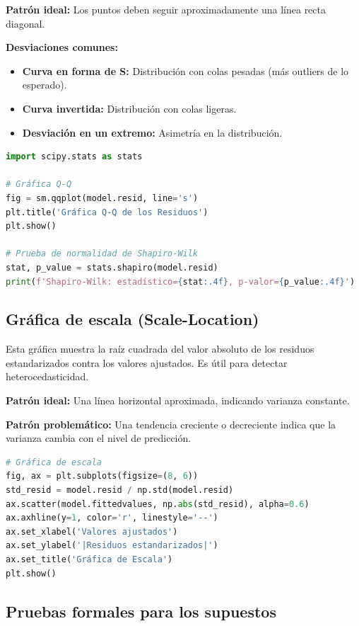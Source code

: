 \textbf{Patrón ideal:} Los puntos deben seguir aproximadamente una línea recta diagonal.

\textbf{Desviaciones comunes:}
\begin{itemize}
	\item \textbf{Curva en forma de S:} Distribución con colas pesadas (más outliers de lo esperado).
	\item \textbf{Curva invertida:} Distribución con colas ligeras.
	\item \textbf{Desviación en un extremo:} Asimetría en la distribución.
\end{itemize}

\begin{lstlisting}[language=Python]
import scipy.stats as stats

# Gráfica Q-Q
fig = sm.qqplot(model.resid, line='s')
plt.title('Gráfica Q-Q de los Residuos')
plt.show()

# Prueba de normalidad de Shapiro-Wilk
stat, p_value = stats.shapiro(model.resid)
print(f'Shapiro-Wilk: estadístico={stat:.4f}, p-valor={p_value:.4f}')
\end{lstlisting}

\subsection{Gráfica de escala (Scale-Location)}

Esta gráfica muestra la raíz cuadrada del valor absoluto de los residuos estandarizados contra los valores ajustados. Es útil para detectar heterocedasticidad.

\textbf{Patrón ideal:} Una línea horizontal aproximada, indicando varianza constante.

\textbf{Patrón problemático:} Una tendencia creciente o decreciente indica que la varianza cambia con el nivel de predicción.

\begin{lstlisting}[language=Python]
# Gráfica de escala
fig, ax = plt.subplots(figsize=(8, 6))
std_resid = model.resid / np.std(model.resid)
ax.scatter(model.fittedvalues, np.abs(std_resid), alpha=0.6)
ax.axhline(y=1, color='r', linestyle='--')
ax.set_xlabel('Valores ajustados')
ax.set_ylabel('|Residuos estandarizados|')
ax.set_title('Gráfica de Escala')
plt.show()
\end{lstlisting}

\subsection{Pruebas formales para los supuestos}

